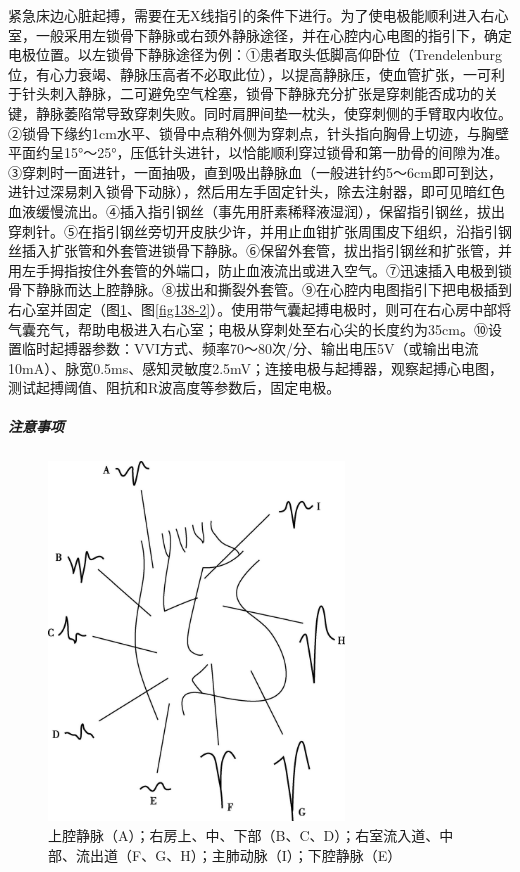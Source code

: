 紧急床边心脏起搏，需要在无X线指引的条件下进行。为了使电极能顺利进入右心室，一般采用左锁骨下静脉或右颈外静脉途径，并在心腔内心电图的指引下，确定电极位置。以左锁骨下静脉途径为例：①患者取头低脚高仰卧位（Trendelenburg位，有心力衰竭、静脉压高者不必取此位），以提高静脉压，使血管扩张，一可利于针头刺入静脉，二可避免空气栓塞，锁骨下静脉充分扩张是穿刺能否成功的关键，静脉萎陷常导致穿刺失败。同时肩胛间垫一枕头，使穿刺侧的手臂取内收位。②锁骨下缘约1cm水平、锁骨中点稍外侧为穿刺点，针头指向胸骨上切迹，与胸壁平面约呈15°～25°，压低针头进针，以恰能顺利穿过锁骨和第一肋骨的间隙为准。③穿刺时一面进针，一面抽吸，直到吸出静脉血（一般进针约5～6cm即可到达，进针过深易刺入锁骨下动脉），然后用左手固定针头，除去注射器，即可见暗红色血液缓慢流出。④插入指引钢丝（事先用肝素稀释液湿润），保留指引钢丝，拔出穿刺针。⑤在指引钢丝旁切开皮肤少许，并用止血钳扩张周围皮下组织，沿指引钢丝插入扩张管和外套管进锁骨下静脉。⑥保留外套管，拔出指引钢丝和扩张管，并用左手拇指按住外套管的外端口，防止血液流出或进入空气。⑦迅速插入电极到锁骨下静脉而达上腔静脉。⑧拔出和撕裂外套管。⑨在心腔内电图指引下把电极插到右心室并固定（图\ref{fig138-1}、图\ref{fig138-2}）。使用带气囊起搏电极时，则可在右心房中部将气囊充气，帮助电极进入右心室；电极从穿刺处至右心尖的长度约为35cm。⑩设置临时起搏器参数：VVI方式、频率70～80次/分、输出电压5V（或输出电流10mA）、脉宽0.5ms、感知灵敏度2.5mV；连接电极与起搏器，观察起搏心电图，测试起搏阈值、阻抗和R波高度等参数后，固定电极。

\subparagraph{注意事项}

\begin{figure}[!htbp]
 \centering
 \includegraphics[width=3.09375in,height=3.76042in]{./images/Image00522.jpg}
 \captionsetup{justification=centering}
 \caption{上腔静脉（A）；右房上、中、下部（B、C、D）；右室流入道、中部、流出道（F、G、H）；主肺动脉（I）；下腔静脉（E）}
 \label{fig138-1}
  \end{figure} 

